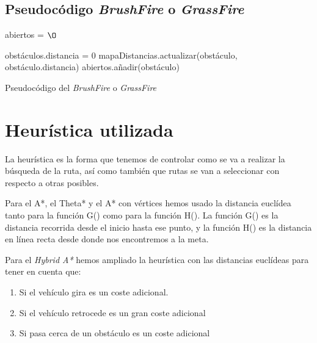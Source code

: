 \subsection{Pseudocódigo \textit{BrushFire} o \textit{GrassFire}}
\begin{algorithm}[H]
	abiertos = $\O$\;

    
     {
    		obstáculos.distancia = 0\;
    		mapaDistancias.actualizar(obstáculo, obstáculo.distancia)\;
    		abiertos.añadir(obstáculo)\;
    	}


 \caption{Pseudocódigo del \textit{BrushFire} o \textit{GrassFire}}
\end{algorithm}

\section{Heurística utilizada}
La heurística es la forma que tenemos de controlar como se va a realizar la búsqueda de la ruta, así como también que rutas se van a seleccionar con respecto a otras posibles.

Para el A*, el Theta* y el A* con vértices hemos usado la distancia euclídea tanto para la función G() como para la función H(). La función G() es la distancia recorrida desde el inicio hasta ese punto, y la función H() es la distancia en línea recta desde donde nos encontremos a la meta.

Para el \textit{Hybrid A*} hemos ampliado la heurística con las distancias euclídeas para tener en cuenta que:
\begin{enumerate}
\item Si el vehículo gira es un coste adicional.
\item Si el vehículo retrocede es un gran coste adicional
\item Si pasa cerca de un obstáculo es un coste adicional
\end{enumerate}

